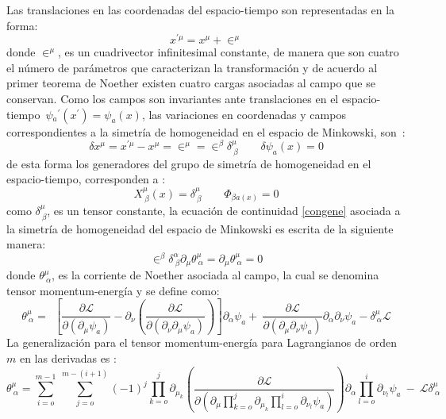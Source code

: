\documentclass[a4paper,12pt]{article}
\begin{document}
Las translaciones en las coordenadas del \mbox{espacio-tiempo} son representadas en la forma: 
\begin{equation}
x^{'\mu}=x^{\mu}+\in^{\mu}
\label{trans}
\end{equation}
donde $\in^{\mu}$, es un cuadrivector infinitesimal constante, de manera que son \mbox{cuatro} el número de parámetros que caracterizan la transformación y de \mbox{acuerdo} al primer \mbox{teorema} de Noether existen cuatro cargas asociadas al \mbox{campo} que se conservan. Como los campos son invariantes ante translaciones en el \mbox{espacio-tiempo \mbox{$\psi{_a}^{'}(x^{'})=\psi_a(x)$,}} las variaciones en coordenadas y campos \mbox{correspondientes} a la simetría de \mbox{homogeneidad} en el espacio de Minkowski, \mbox{son \cite{ noether, greiner}:}  
\begin{equation}
\delta x^{\mu}=x^{'\mu}-x^{\mu}=\in^{\mu}=\in^{\beta}\delta_{\ \beta}^\mu\ \ \ \ \ \ \ \ \ \delta\psi_a(x)=0 
\label{vartrans}
\end{equation}
de esta forma los generadores del grupo de simetría de homogeneidad en el \mbox{espacio-tiempo}, corresponden a \cite{general}:
\begin{equation}
X_{\ \beta}^\mu(x)=\delta_{\ \beta}^\mu \ \ \ \ \ \ \ \ \ \Phi_{\beta a(x)}=0
\end{equation}
como $\delta_{\ \beta}^\mu$, es un tensor constante, la ecuación de continuidad \eqref{congene} asociada a la simetría de homogeneidad del espacio de Minkowski es escrita de la siguiente manera:
\begin{equation}
\in^{\beta}\delta_{\ \beta}^\alpha\partial_\mu\theta^{\mu}_{\ \alpha}=\partial_\mu\theta^{\mu}_{\ \alpha}=0 
\end{equation}
donde $\theta^{\mu}_{\ \alpha}$, es la corriente de Noether asociada al campo, la cual se denomina tensor momentum-energía y se define como:
\begin{equation}
\theta^{\mu}_{\ \alpha}= \ \ \left[\frac{\partial \mathscr{L} }{\partial(\partial_{\mu} \psi_a)}-\partial_{\nu}\left(\frac{\partial\mathscr{L} }{\partial(\partial_{\nu}\partial_{\mu} \psi_a)}  \right) \right]\partial_\alpha\psi_a +\ \frac{\partial\mathscr{L} }{\partial(\partial_{\mu}\partial_{\nu} \psi_a)}\partial_\alpha\partial_\nu\psi_a-\delta^\mu_{\ \alpha}\mathscr{L}
\label{temoend}
\end{equation}
La generalización para el tensor momentum-energía para Lagrangianos de orden $m$ en las derivadas es \cite{general}:
{\small
\begin{equation}
\theta^{\mu}_{\ \alpha}= \sum\limits_{i=o}^{m-1}\ \sum\limits_{j=o}^{m-(i+1)}(-1)^j\prod\limits_{k=o}^{j}\partial_{\mu_k}\left(\frac{\partial\mathscr{L}}{\partial\left(\partial_\mu\prod\limits_{k=o}^{j}\partial_{\mu_k}\prod\limits_{l=o}^{i}\partial_{\nu_l}\psi_a\right)}\right)\partial_\alpha\prod\limits_{l=o}^{i}\partial_{\nu_l}\psi_a\ -\ \mathscr{L}\delta_{\ \alpha}^\mu
\end{equation}}\\
\end{document}
